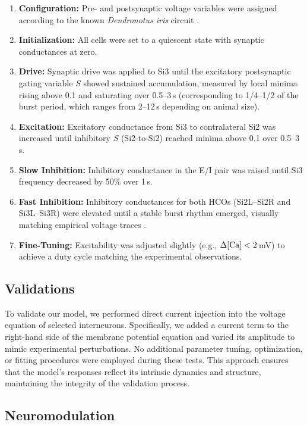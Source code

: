 \documentclass[nofootinbib,aip,amsmath,amssymb,reprint,twocolumn,10pt]{revtex4-2}
\begin{document}
\begin{enumerate}
  \item \textbf{Configuration:} Pre- and postsynaptic voltage variables were assigned according to the known \textit{Dendronotus iris} circuit \cite{SakuraiKatz2016}.
  \item \textbf{Initialization:} All cells were set to a quiescent state with synaptic conductances at zero.
  \item \textbf{Drive:} Synaptic drive was applied to Si3 until the excitatory postsynaptic gating variable $S$ showed sustained accumulation, measured by local minima rising above 0.1 and saturating over 0.5--3\,s (corresponding to 1/4--1/2 of the burst period, which ranges from 2--12\,s depending on animal size).
  \item \textbf{Excitation:} Excitatory conductance from Si3 to contralateral Si2 was increased until inhibitory $S$ (Si2-to-Si2) reached minima above 0.1 over 0.5--3\,s.
  \item \textbf{Slow Inhibition:} Inhibitory conductance in the E/I pair was raised until Si3 frequency decreased by 50\% over 1\,s.
  \item \textbf{Fast Inhibition:} Inhibitory conductances for both HCOs (Si2L--Si2R and Si3L--Si3R) were elevated until a stable burst rhythm emerged, visually matching empirical voltage traces \cite{SakuraiKatz2016}.
  \item \textbf{Fine-Tuning:} Excitability was adjusted slightly (e.g., $\Delta [\rm Ca] < 2$\,mV) to achieve a duty cycle matching the experimental observations.
\end{enumerate}

\subsection{Validations}

To validate our model, we performed direct current injection into the voltage equation of selected interneurons. Specifically, we added a current term to the right-hand side of the membrane potential equation and varied its amplitude to mimic experimental perturbations. No additional parameter tuning, optimization, or fitting procedures were employed during these tests. This approach ensures that the model's responses reflect its intrinsic dynamics and structure, maintaining the integrity of the validation process.

\subsection{Neuromodulation}
\end{document}
